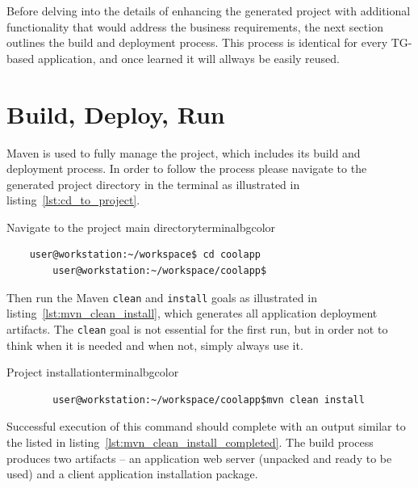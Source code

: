   Before delving into the details of enhancing the generated project with additional functionality that would address the business requirements, the next section outlines the build and deployment process.
  This process is identical for every TG-based application, and once learned it will allways be easily reused.

\section{Build, Deploy, Run}
  Maven is used to fully manage the project, which includes its build and deployment process.
  In order to follow the process please navigate to the generated project directory in the terminal as illustrated in listing~\ref{lst:cd_to_project}.
  
  \begin{code}{Navigate to the project main directory}{\label{lst:cd_to_project}}{terminalbgcolor}
      \begin{lstlisting}
	user@workstation:~/workspace$ cd coolapp
        user@workstation:~/workspace/coolapp$
      \end{lstlisting}
  \end{code}

  Then run the Maven \texttt{clean} and \texttt{install} goals as illustrated in listing~\ref{lst:mvn_clean_install}, which generates all application deployment artifacts.
  The \texttt{clean} goal is not essential for the first run, but in order not to think when it is needed and when not, simply always use it.

  \begin{code}{Project installation}{\label{lst:mvn_clean_install}}{terminalbgcolor}
     \begin{lstlisting}
        user@workstation:~/workspace/coolapp$mvn clean install
     \end{lstlisting}
  \end{code}

  Successful execution of this command should complete with an output similar to the listed in listing~\ref{lst:mvn_clean_install_completed}.
  The build process produces two artifacts -- an application web server (unpacked and ready to be used) and a client application installation package.
  
